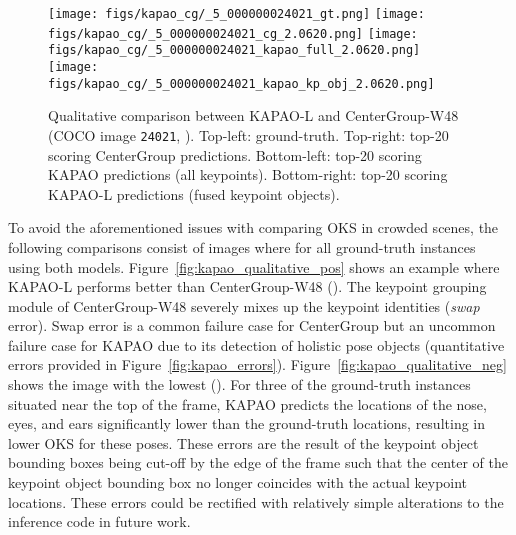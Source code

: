 \documentclass[runningheads]{llncs}
\begin{document}
\begin{figure}[t!]
\centering
    \texttt{[image: figs/kapao\_cg/\_5\_000000024021\_gt.png]}
    \texttt{[image: figs/kapao\_cg/\_5\_000000024021\_cg\_2.0620.png]}
    \texttt{[image: figs/kapao\_cg/\_5\_000000024021\_kapao\_full\_2.0620.png]}
    \texttt{[image: figs/kapao\_cg/\_5\_000000024021\_kapao\_kp\_obj\_2.0620.png]}
\caption[Qualitative comparison between KAPAO-L and CenterGroup-W48 (COCO image \texttt{24021}).]{Qualitative comparison between KAPAO-L and CenterGroup-W48 (COCO image \texttt{24021}, ). Top-left: ground-truth. Top-right: top-20 scoring CenterGroup predictions. Bottom-left: top-20 scoring KAPAO predictions (all keypoints). Bottom-right: top-20 scoring KAPAO-L predictions (fused keypoint objects).}
\label{fig:kapao_qualitative_crowd}
\end{figure}

To avoid the aforementioned issues with comparing OKS in crowded scenes, the following comparisons consist of images where  for all ground-truth instances using both models. Figure~\ref{fig:kapao_qualitative_pos} shows an example where KAPAO-L performs better than CenterGroup-W48 (). The keypoint grouping module of CenterGroup-W48 severely mixes up the keypoint identities (\textit{swap} error). Swap error is a common failure case for CenterGroup but an uncommon failure case for KAPAO due to its detection of holistic pose objects (quantitative errors provided in Figure~\ref{fig:kapao_errors}). Figure~\ref{fig:kapao_qualitative_neg} shows the image with the lowest  (). For three of the ground-truth instances situated near the top of the frame, KAPAO predicts the locations of the nose, eyes, and ears significantly lower than the ground-truth locations, resulting in lower OKS for these poses. These errors are the result of the keypoint object bounding boxes being cut-off by the edge of the frame such that the center of the keypoint object bounding box no longer coincides with the actual keypoint locations. These errors could be rectified with relatively simple alterations to the inference code in future work. 
\end{document}
